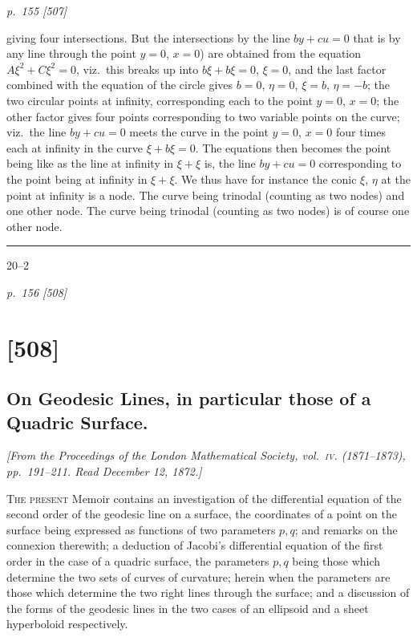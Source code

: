 \documentclass[11pt,a4paper]{book}
\begin{document}
\bigskip
\textit{p.~155 [507]}
\smallskip

\noindent
giving four intersections. But the intersections by the line $by + cu = 0$ that is by any
line through the point $y = 0$, $x = 0$) are obtained from the equation $A\xi^2 + C\xi^2 = 0$, viz.\
this breaks up into $b\xi + b\xi = 0$, $\xi = 0$, and the last factor combined with the equation
of the circle gives $b = 0$, $\eta = 0$, $\xi = b$, $\eta = -b$; the two circular points at infinity, corresponding
each to the point $y = 0$, $x = 0$; the other factor gives four points corresponding to two
variable points on the curve; viz.\ the line $by + cu = 0$ meets the curve in the point $y = 0$,
$x = 0$ four times each at infinity in the curve $\xi + b\xi = 0$. The equations then becomes the
point being like as the line at infinity in $\xi + \xi$ is, the line $by + cu = 0$ corresponding to the
point being at infinity in $\xi + \xi$. We thus have for instance the conic $\xi$, $\eta$ at the
point at infinity is a node. The curve being trinodal (counting as two nodes) and one
other node. The curve being trinodal (counting as two nodes) is of course one
other node.

\rule{0.5\textwidth}{0.4pt}\par
\begin{center}
\end{center}

\hfill 20--2

\clearpage

\bigskip
\textit{p.~156 [508]}
\smallskip

\section{[508]}
\subsection{On Geodesic Lines, in particular those of a Quadric Surface.}

\begin{center}
\textit{[From the Proceedings of the London Mathematical Society, vol.~\textsc{iv}. (1871--1873), pp.~191--211.  Read December 12, 1872.]}
\end{center}

\textsc{The present} Memoir contains an investigation of the differential equation of the
second order of the geodesic line on a surface, the coordinates of a point on the
surface being expressed as functions of two parameters $p, q$; and remarks on the
connexion therewith; a deduction of Jacobi's differential equation of the first order in
the case of a quadric surface, the parameters $p, q$ being those which determine the
two sets of curves of curvature; herein when the parameters are those which
determine the two right lines through the surface; and a discussion of the forms of
the geodesic lines in the two cases of an ellipsoid and a sheet hyperboloid respectively.
\end{document}
